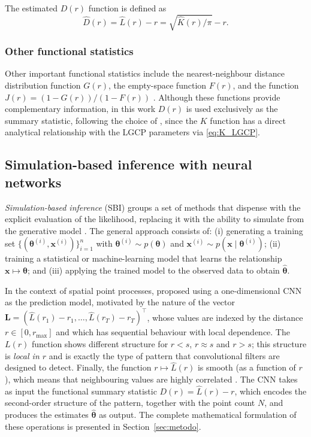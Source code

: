 \documentclass[a4paper,fleqn]{cas-sc}
\numberwithin{equation}{section}
\begin{document}
The estimated $D(r)$ function is defined as
\begin{equation}
    \hat{D}(r) = \widehat{L}(r) - r = \sqrt{\widehat{K}(r)/\pi} - r.
    \label{eq:D_function}
\end{equation}

\subsubsection{Other functional statistics}

Other important functional statistics include the nearest-neighbour
distance distribution function $G(r)$, the empty-space function
$F(r)$, and the function $J(r)=(1-G(r))/(1-F(r))$
\citep{VanLieshoutBaddeley1996, MollerWaagepetersen2004}. Although
these functions provide complementary information, in this work $D(r)$
is used exclusively as the summary statistic, following the choice of
\citet{VIHRS2022}, since the $K$ function has a direct analytical
relationship with the LGCP parameters via \eqref{eq:K_LGCP}.

\subsection{Simulation-based inference with neural networks}
\label{sec:cnn_theory}

\emph{Simulation-based inference} (SBI) groups a set of methods that
dispense with the explicit evaluation of the likelihood, replacing it
with the ability to simulate from the generative model
\citep{Cranmer2020}. The general approach consists of: (i) generating a
training set
$\{(\boldsymbol{\theta}^{(i)},\mathbf{x}^{(i)})\}_{i=1}^{n}$ with
$\boldsymbol{\theta}^{(i)}\sim p(\boldsymbol{\theta})$ and
$\mathbf{x}^{(i)}\sim p(\mathbf{x}\mid\boldsymbol{\theta}^{(i)})$;
(ii) training a statistical or machine-learning model that learns the
relationship $\mathbf{x}\mapsto\boldsymbol{\theta}$; and (iii) applying
the trained model to the observed data to obtain
$\hat{\boldsymbol{\theta}}$.

In the context of spatial point processes, \citet{VIHRS2022} proposed
using a one-dimensional CNN as the prediction model, motivated by the
nature of the vector
$\mathbf{L}=(\hat{L}(r_1)-r_1,\ldots,\hat{L}(r_T)-r_T)^\top$, whose
values are indexed by the distance $r\in[0,r_{\max}]$ and which has
sequential behaviour with local dependence. The $L(r)$ function shows
different structure for $r < s$, $r \approx s$ and $r > s$; this
structure is \emph{local in $r$} and is exactly the type of pattern
that convolutional filters are designed to detect. Finally, the
function $r\mapsto\hat{L}(r)$ is smooth (as a function of $r$), which
means that neighbouring values are highly correlated
\citep{Kiranyaz2021}. The CNN takes as input the functional summary
statistic $D(r)=\hat{L}(r)-r$, which encodes the second-order
structure of the pattern, together with the point count $N$, and
produces the estimates $\hat{\boldsymbol{\theta}}$ as output. The
complete mathematical formulation of these operations is presented in
Section~\ref{sec:metodo}.
\end{document}
